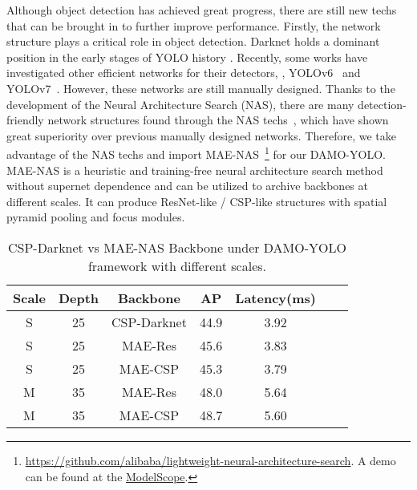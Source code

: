 \documentclass[10pt,twocolumn,letterpaper]{article}
\begin{document}
Although object detection has achieved great progress, there are still new techs that can be brought in to further improve performance.
Firstly, the network structure plays a critical role in object detection. 
Darknet holds a dominant position in the early stages of YOLO history \cite{redmon2016yolo,yolov2,yolov3,yolov4,yolov5,yolox}. 
Recently, some works have investigated other efficient networks for their detectors, \ie, YOLOv6~\cite{yolov6} and YOLOv7~\cite{yolov7}. However, these networks are still manually designed. 
Thanks to the development of the Neural Architecture Search (NAS), 
there are many detection-friendly network structures found through the NAS techs~\cite{detnas,spnas,maedet}, which have shown great superiority over previous manually designed networks.
Therefore, we take advantage of the NAS techs and import MAE-NAS~\cite{maedet}\footnote{
\href{https://github.com/alibaba/lightweight-neural-architecture-search}{https://github.com/alibaba/lightweight-neural-architecture-search}. A demo can be found at the  \href{https://modelscope.cn/studios/damo/TinyNAS/summary}{ModelScope}.
} for our DAMO-YOLO. MAE-NAS is a heuristic and training-free neural architecture search method without supernet dependence and can be utilized to archive backbones at different scales. It can produce ResNet-like / CSP-like structures with spatial pyramid pooling and focus modules.
\begin{table}
    \begin{center}
    \caption{CSP-Darknet vs MAE-NAS Backbone under DAMO-YOLO framework with different scales.}
    \label{tab:head_ab_temp}
    \setlength{\tabcolsep}{3pt}
    \begin{tabular}{ccccccc}
    \toprule
     Scale & Depth&Backbone & AP & Latency(ms)    \\
    \midrule 
     S & 25&CSP-Darknet & 44.9 & 3.92 \\
    S & 25&MAE-Res & 45.6 & 3.83 \\
    S & 25&MAE-CSP & 45.3 & 3.79  \\
    M & 35&MAE-Res & 48.0  & 5.64   \\
    M & 35&MAE-CSP  & 48.7 & 5.60     \\
    \bottomrule
    \end{tabular}
    \end{center}
\end{table}
\end{document}

